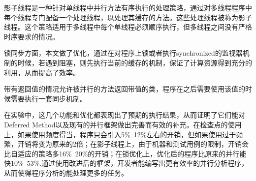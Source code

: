 影子线程是一种针对单线程中并行方法有序执行的处理策略，通过对多线程程序中每个线程专门配备一个处理线程，以处理其缓存的方法。这些处理线程被称为影子线程。这个策略适用于多线程中每个单线程必须顺序执行，但多线程之间没有严格时序要求的情况。

锁同步方面，本文做了优化，通过在对程序上锁或者执行synchronized的监视器机制的时候，若遇到阻塞，则先执行当前的缓存的机制，保证了计算资源得到充分的利用，从而提高了效率。

带有返回值的情况允许被并行的方法返回带值的类，程序在之后需要使用该值的时候需要执行一套同步机制。

在实验中，这几个功能和优化都表现出了预期的执行结果，从而证明了它们能对Deferred Method以及现有的并行框架做出完善而有效的补充。在检查点的使用上，如果使用频度得当，程序只会引入5\%~12\%左右的开销，但如果使用过于频繁，开销将变为原来的2倍；在影子线程上，由于机器和测试用例的限制，开销会比自适应的策略多16\%~20\%的开销；在锁优化上，优化后的程序比原来的并行能快10\%~53\%.通过使用改进后的框架，开发者能编写出更有效率的并行分析程序，从而使得程序分析的能处理更多的任务。
